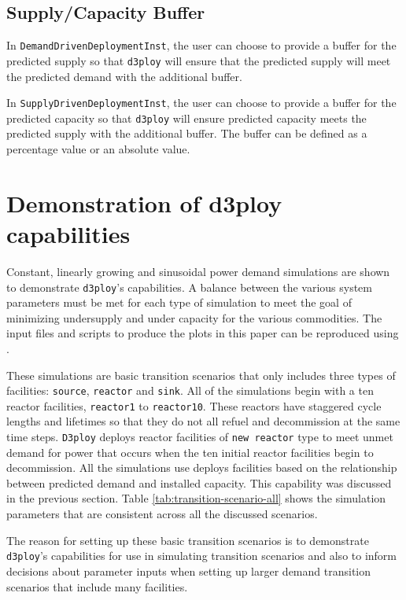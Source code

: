 \documentclass{anstrans}
\newcommand{\deploy}{\texttt{d3ploy}\xspace}%
\newcommand{\Deploy}{\texttt{D3ploy}\xspace}%
\begin{document}
\subsection{\textbf{Supply/Capacity Buffer}}
In \texttt{DemandDrivenDeploymentInst}, the user can choose to provide a
buffer for the predicted supply so that \deploy will ensure that 
the predicted supply will meet the predicted demand with the 
additional buffer. 

In \texttt{SupplyDrivenDeploymentInst}, the user can choose to 
provide a buffer for the predicted capacity so that \deploy will 
ensure predicted capacity meets the predicted supply with the 
additional buffer. 
The buffer can be defined as a percentage value or an absolute value.  


\section{Demonstration of d3ploy capabilities}
Constant, linearly growing and sinusoidal power demand simulations
are shown to demonstrate \deploy's capabilities. 
A balance between the various system parameters must be 
met for each type of simulation to meet the goal of 
minimizing undersupply and under capacity for the various 
commodities. 
The input files and scripts to produce the plots in this paper 
can be reproduced using \cite{d3ploy_doi_2019}. 

These simulations are basic transition scenarios that only includes 
three types of facilities: \texttt{source}, \texttt{reactor} and 
\texttt{sink}.
All of the simulations begin with a ten reactor facilities, 
\texttt{reactor1} to \texttt{reactor10}. 
These reactors have staggered cycle lengths and lifetimes 
so that they do not all refuel and decommission at the same time 
steps. 
\Deploy deploys reactor facilities of \texttt{new reactor} type
to meet unmet demand for power that occurs when the ten initial 
reactor facilities begin to decommission. 
All the simulations use deploys facilities based on the relationship
between predicted demand and installed capacity. 
This capability was discussed in the previous section.  
Table \ref{tab:transition-scenario-all} shows the simulation 
parameters that are consistent across all the discussed 
scenarios. 

The reason for setting up these basic transition scenarios is to 
demonstrate \deploy's capabilities for use in simulating 
transition scenarios and 
also to inform decisions about parameter inputs when setting up larger 
demand transition scenarios that include many facilities. 
\end{document}
